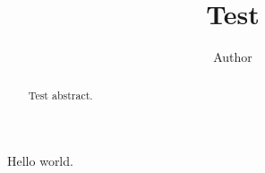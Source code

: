 \documentclass[conference]{IEEEtran}
\begin{document}
\title{Test}
\author{Author}
\maketitle
\begin{abstract}
Test abstract.
\end{abstract}
Hello world.
\end{document}
